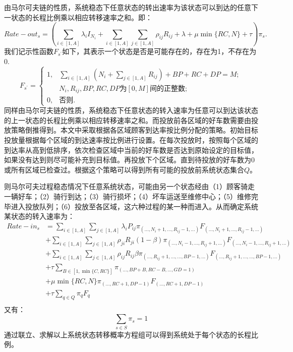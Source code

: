 \documentclass{article}
\begin{document}
由马尔可夫链的性质，系统稳态下任意状态的转出速率为该状态可以到达的任意下一状态的长程比例乘以相应转移速率之和。即：
\begin{equation}
Rate-out_{s} = (\sum \limits _{i \in [1,A]}\lambda_i I_{N_i}+\sum \limits _{i \in [1,A]} \sum \limits _{j \in [1,A]} \rho_{ij} R_{ij}+\lambda +\mu \min \{RC, N\} + \tau )\pi_s.
\end{equation}
我们记示性函数$F_{s^{'}}$如下，其表示一个状态是否是可能存在的，存在为1，不存在为0.
\begin{equation}
F_{s^{'}}=
    \left\{
        \begin{array}{lcl}
            1, &\sum \limits _{i \in [1,A]}(N_i+\sum \limits _{j \in [1,A]}R_{ij})+BP+RC+DP= M;\\ & N_i, R_{ij}, BP, RC, DP\mbox{为}[0,M]\mbox{间的正整数};\\
            0, &\mbox{否则}.
        \end{array}
    \right .  
\end{equation}
同样由马尔可夫链的性质，系统稳态下任意状态的转入速率为任意可以到达该状态的上一状态的长程比例乘以相应转移速率之和。而投放前各区域的好车数需要由投放策略倒推得到。本文中采取根据各区域顾客到达率按比例分配的策略。初始目标投放量根据每个区域的到达速率按比例进行设置。在每次投放时，按照每个区域的到达率从高到低排序，依次检查区域中当前的好车数是否达到原始设定的目标值，如果没有达到则尽可能补充到目标值。再投放下个区域。直到待投放的好车数为0或所有区域已检查过。根据这个策略可以得到所有可能的投放前系统状态集合$Q$。

则马尔可夫过程稳态情况下任意系统状态，可能由另一个状态经由（1）顾客骑走一辆好车；（2）骑行到达；（3）骑行损坏；（4）坏车运送至维修中心；（5）维修完毕进入投放队列；（6）投放至各区域，这六种过程的某一种而进入。从而确定系统某状态的转入速率为：
\begin{equation}
    \begin{aligned}
        Rate-in_{s} &= 
        \sum \limits _{i \in [1,A]} \sum \limits _{j \in [1,A]} \lambda_i P_{ij} \pi_{(\dots, N_i+1, \dots ,R_{ij}-1,\dots)} F_{(\dots, N_i+1, \dots ,R_{ij}-1,\dots)}\\
        &+\sum \limits _{i \in [1,A]} \sum \limits _{j \in [1,A]} \rho_{ji} R_{ji} (1-\beta) \pi_{(\dots, N_i-1, \dots ,R_{ij}+1,\dots)} F_{(\dots, N_i-1, \dots ,R_{ij}+1,\dots)}\\
        &+\sum \limits _{i \in [1,A]} \sum \limits _{j \in [1,A]} \rho_{ij} R_{ij} \beta \pi_{(\dots ,R_{ij}+1, \dots, \dots, BP-1, \dots)} F_{(\dots ,R_{ij}+1, \dots, \dots, BP-1, \dots)}\\
        &+\tau \sum \limits _{B \in [1,\min\{C, RC\}] } \pi_{(\dots, BP+B, RC-B, \dots, GD=1)} \\
        &+\mu \min \{RC, N\} \pi_{(\dots, RC+1, DP-1)} F_{(\dots, RC+1, DP-1)}\\
        &+\tau \sum \limits _{q \in Q}\pi_{q} F_{q}\\
    \end{aligned}
\end{equation}
又有：
\begin{equation}
    \sum \limits _{s \in S} \pi_{s} = 1
\end{equation}
通过联立、求解以上系统状态转移概率方程组可以得到系统处于每个状态的长程比例。
\end{document}
